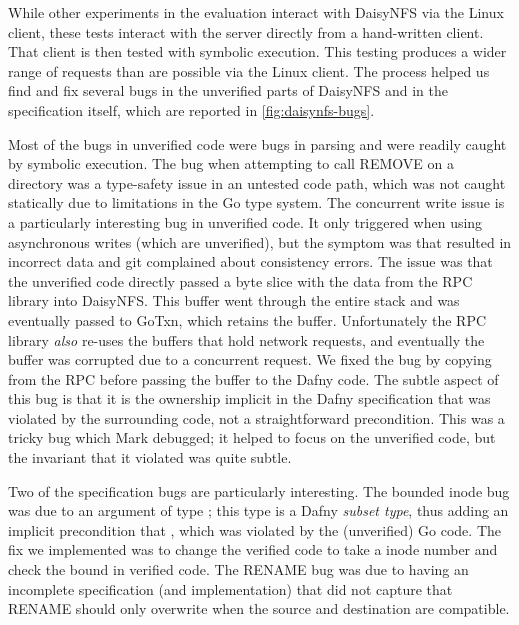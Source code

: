 While other experiments in the evaluation interact with DaisyNFS via the Linux
client, these tests interact with the server directly from a hand-written
client. That client is then tested with symbolic execution.
This testing produces a wider range of requests than are possible via the Linux
client. The process helped us find and fix several bugs in the unverified parts
of DaisyNFS and in the specification itself, which are reported in
\cref{fig:daisynfs-bugs}.

Most of the bugs in unverified code were bugs in parsing and were readily caught
by symbolic execution. The bug when attempting to call REMOVE on a directory was
a type-safety issue in an untested code path, which was not caught statically
due to limitations in the Go type system. The concurrent write issue is
a particularly interesting bug in unverified code. It only triggered when using
asynchronous writes (which are unverified), but the symptom was that  resulted in incorrect data and git complained about consistency errors.
The issue was that the unverified code directly passed a byte slice with the
 data from the RPC library into DaisyNFS. This buffer went through the
entire stack and was eventually passed to GoTxn, which retains the buffer.
Unfortunately the RPC library \emph{also} re-uses the buffers that hold network
requests, and eventually the buffer was corrupted due to a concurrent request.
We fixed the bug by copying from the RPC before passing the buffer to the Dafny
code. The subtle aspect of this bug is that it is the ownership implicit in the
Dafny specification that was violated by the surrounding code, not a
straightforward precondition.  This was a tricky bug which Mark debugged; it
helped to focus on the unverified code, but the invariant that it violated was
quite subtle.

Two of the specification bugs are particularly interesting. The bounded inode bug
was due to an  argument of type ; this type is a Dafny
\emph{subset type}, thus adding an implicit precondition that , which was violated by the (unverified) Go code. The fix we implemented was to change the verified code to take a  inode number and check the bound in verified code. The RENAME bug was due
to having an incomplete specification (and implementation) that did not capture
that RENAME should only overwrite when the source and destination are
compatible.

